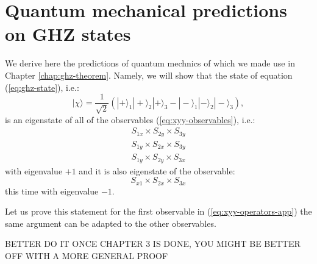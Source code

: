 \section{Quantum mechanical predictions on GHZ states}
We derive here the predictions of quantum mechnics of which we made use in Chapter \ref{chap:ghz-theorem}. Namely, we will show that the state of equation (\ref{eq:ghz-state}), i.e.:
\begin{equation*}
  |\chi\rangle = \frac{1}{\sqrt{2}} \left( |+\rangle_1 |+\rangle_2 |+\rangle_3 - |-\rangle_1 |-\rangle_2 |-\rangle_3 \right),
\end{equation*}
is an eigenstate of all of the observables (\ref{eq:xyy-observables}), i.e.:
\begin{equation}
  \begin{split}
    S_{1x} \times S_{2y} \times S_{3y}\\
    S_{1y} \times S_{2x} \times S_{3y}\\
    S_{1y} \times S_{2y} \times S_{3x}
  \end{split}
  \label{eq:xyy-operators-app}
\end{equation}
with eigenvalue $+ 1$ and it is also eigenstate of the observable:
\begin{equation*}
  S_{x1} \times S_{2x} \times S_{3x}
\end{equation*}
this time with eigenvalue $- 1$.

Let us prove this statement for the first observable in (\ref{eq:xyy-operators-app}) the same argument can be adapted to the other observables.

BETTER DO IT ONCE CHAPTER 3 IS DONE, YOU MIGHT BE BETTER OFF WITH A MORE GENERAL PROOF
